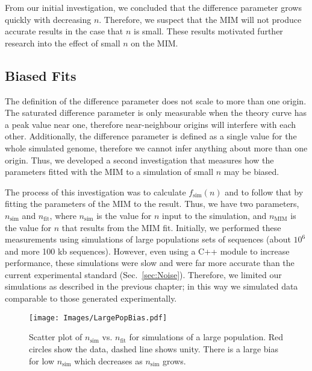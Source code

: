 		From our initial investigation, we concluded that the difference parameter grows quickly with decreasing $n$.
		Therefore, we suspect that the MIM will not produce accurate results in the case that $n$ is small.
		These results motivated further research into the effect of small $n$ on the MIM.
		
		
		\subsection{Biased Fits}
		\label{subsec:BiasedFits}
		
		The definition of the difference parameter does not scale to more than one origin.
		The saturated difference parameter is only measurable when the theory curve has a peak value near one, therefore near-neighbour origins will interfere with each other.
		Additionally, the difference parameter is defined as a single value for the whole simulated genome, therefore we cannot infer anything about more than one origin.
		Thus, we developed a second investigation that measures how the parameters fitted with the MIM to a simulation of small $n$ may be biased.
		
		The process of this investigation was to calculate $f_\text{sim}(n)$ and to follow that by fitting the parameters of the MIM to the result.
		Thus, we have two parameters, $n_\text{sim}$ and $n_\text{fit}$, where $n_\text{sim}$ is the value for $n$ input to the simulation, and $n_\text{MIM}$ is the value for $n$ that results from the MIM fit.
		Initially, we performed these measurements using simulations of large populations sets of sequences (about $10^6$ and more 100 kb sequences).
		However, even using a C++ module to increase performance, these simulations were slow and were far more accurate than the current experimental standard (Sec.~\ref{sec:Noise}).
		Therefore, we limited our simulations as described in the previous chapter; in this way we simulated data comparable to those generated experimentally.
		
		\begin{figure}[tbh]
			\begin{center}
				\texttt{[image: Images/LargePopBias.pdf]}
			\end{center}
			\caption[Bias in MIM fit on Large-Population Simulations]{\label{fig:LargePopulation} Scatter plot of $n_\text{sim}$ vs. $n_\text{fit}$ for simulations of a large population.
			Red circles show the data, dashed line shows unity.
			There is a large bias for low $n_\text{sim}$ which decreases as $n_\text{sim}$ grows.
			}
		\end{figure}
		
